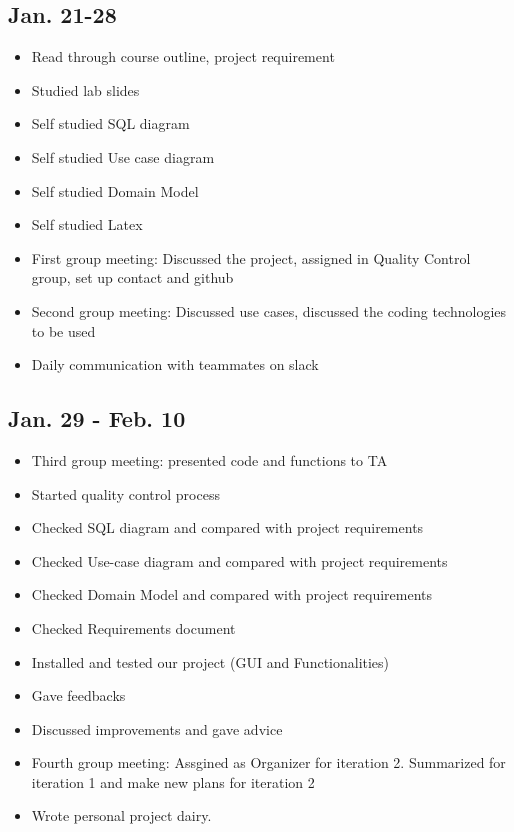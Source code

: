 \documentclass[12pt]{article}
\begin{document}
\maketitle


\subsection*{Jan. 21-28 }
\begin{itemize}
\item Read through course outline, project requirement
\item Studied lab slides 
\item Self studied SQL diagram 
\item Self studied Use case diagram
\item Self studied Domain Model
\item Self studied Latex
\item First group meeting: Discussed the project, assigned in Quality Control group, set up contact and github
\item Second group meeting: Discussed use cases, discussed the coding technologies to be used
\item Daily communication with teammates on slack
\end{itemize}



\subsection*{Jan. 29 - Feb. 10}

\begin{itemize}
     \item Third group meeting: presented code and functions to TA
     \item Started quality control process 
     \item Checked SQL diagram and compared with project requirements 
     \item Checked Use-case diagram and compared with project requirements 
     \item Checked Domain Model and compared with project requirements 
     \item Checked Requirements document
     \item Installed and tested our project (GUI and Functionalities)
     \item Gave feedbacks 
     \item Discussed improvements and gave advice 
     \item Fourth group meeting: Assgined as Organizer for iteration 2. Summarized for iteration 1 and make new plans for iteration 2 
     \item Wrote personal project dairy. 
\end{itemize}
\end{document}
